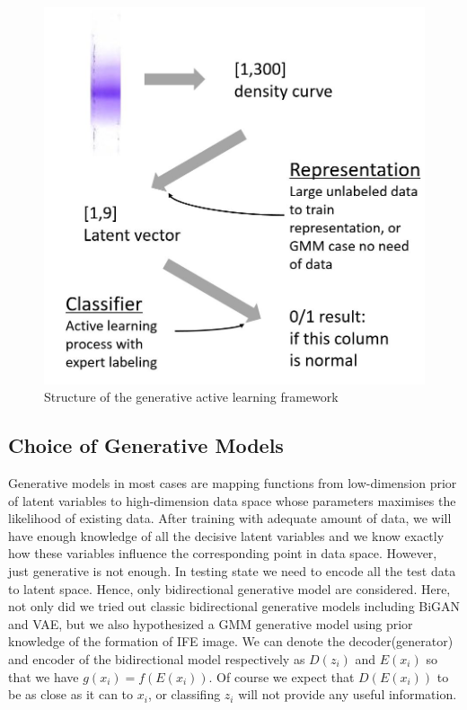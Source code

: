 \documentclass[10pt,twocolumn,letterpaper]{article}
\begin{document}
\begin{figure}[t]
    \begin{center}
       \includegraphics[width=0.8\linewidth]{fig_2.jpg}
    \end{center}
       \caption{Structure of the generative active learning framework}
    \end{figure}

\subsection{Choice of Generative Models}
Generative models in most cases are mapping functions from low-dimension prior of latent variables to high-dimension data space whose parameters maximises the likelihood of existing data\cite{goodfellow2016nips}. After training with adequate amount of data, we will have enough knowledge of all the decisive latent variables and we know exactly how these variables influence the corresponding point in data space. However, just generative is not enough. In testing state we need to encode all the test data to latent space. Hence, only bidirectional generative model are considered. Here, not only did we tried out classic bidirectional generative models including BiGAN and VAE, but we also hypothesized a GMM generative model using prior knowledge of the formation of IFE image. We can denote the decoder(generator) and encoder of the bidirectional model respectively as $D(z_i)$ and $E(x_i)$ so that we have $g(x_i)=f(E(x_i))$. Of course we expect that $D(E(x_i))$ to be as close as it can to $x_i$, or classifing $z_i$ will not provide any useful information.
\end{document}
